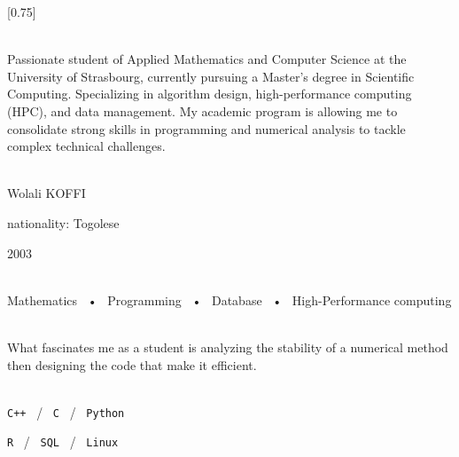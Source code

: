 \documentclass[lighthipster]{simplehipstercv}
\begin{document}
\setlength{\columnsep}{1.5cm}
[0.75]
\begin{paracol}{2}

\paracolbackgroundoptions



\footnotesize
{\setasidefontcolour
\flushright
\begin{center}
\end{center}

\\[0.5em]

{Passionate student of Applied Mathematics and Computer Science at the University of Strasbourg, 
currently pursuing a Master's degree in Scientific Computing. Specializing in algorithm design, high-performance computing (HPC), and data management. My academic program is allowing me to consolidate strong skills in programming and numerical analysis to tackle complex technical challenges.}
\bigskip

 \\[0.5em]
Wolali KOFFI

nationality: Togolese

2003

\bigskip

 \\[0.5em]

Mathematics ~•~ Programming ~•~ Database ~•~ High-Performance computing

\bigskip



\bigskip

\\[0.5em]

What fascinates me as a student is analyzing the stability of a numerical method
then designing the code that make it efficient.
\bigskip

\\[0.5em]

\texttt{C++} ~/~ \texttt{C} ~/~ \texttt{Python}

\texttt{R} ~/~ \texttt{SQL} ~/~ \texttt{Linux}



\vspace{4em}

}
\end{paracol}
\end{document}
